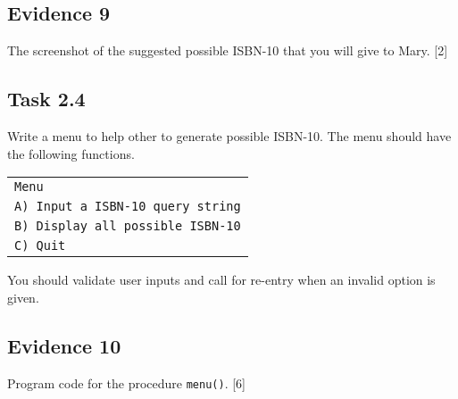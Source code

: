 \subsection*{Evidence 9 }

The screenshot of the suggested possible ISBN-10 that you will give
to Mary.\hfill{} {[}2{]}

\subsection*{Task 2.4 }

Write a menu to help other to generate possible ISBN-10. The menu
should have the following functions. 
\noindent \begin{center}
\begin{tabular}{|l|}
\hline 
\texttt{Menu}\tabularnewline
\texttt{A) Input a ISBN-10 query string}\tabularnewline
\texttt{B) Display all possible ISBN-10}\tabularnewline
\texttt{C) Quit}\tabularnewline
\hline 
\end{tabular}
\par\end{center}

You should validate user inputs and call for re-entry when an invalid
option is given. 

\subsection*{Evidence 10}

Program code for the procedure \texttt{menu()}.\hfill{} {[}6{]}